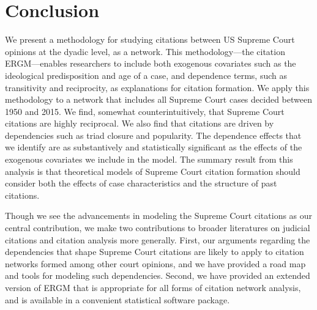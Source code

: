 \documentclass{cup-pan}
\begin{document}
\section{Conclusion}

We present a methodology for studying citations between US Supreme Court opinions at the dyadic level, as a network. This methodology---the citation ERGM---enables researchers to include both exogenous covariates such as the ideological predisposition and age of a case, and dependence terms, such as transitivity and reciprocity, as explanations for citation formation. We apply this methodology to a network that includes all Supreme Court cases decided between 1950 and 2015. We find, somewhat counterintuitively, that Supreme Court citations are highly reciprocal. We also find that citations are driven by dependencies such as triad closure and popularity. The dependence effects that we identify are as substantively and statistically significant as the effects of the exogenous covariates we include in the model. The summary result from this analysis is that theoretical models of Supreme Court citation formation should consider both the effects of case characteristics and the structure of past citations. 

Though we see the advancements in modeling the Supreme Court citations as our central contribution, we make two contributions to broader literatures on judicial citations and citation analysis more generally. First, our arguments regarding the dependencies that shape Supreme Court citations are likely to apply to citation networks formed among other court opinions, and we have provided a road map and tools for modeling such dependencies. Second, we have provided an extended version of ERGM that is appropriate for all forms of citation network analysis, and is available in a convenient statistical software package.

\printbibliography
\end{document}

